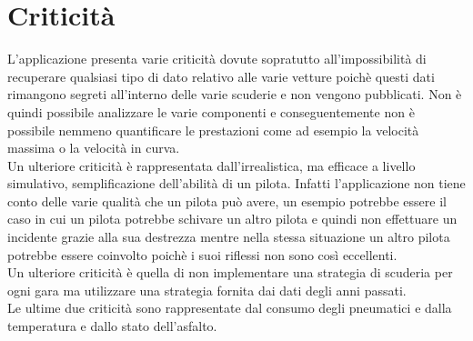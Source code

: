 \section[Criticità]{Criticità} %
L'applicazione presenta varie criticità dovute sopratutto all'impossibilità di recuperare qualsiasi tipo di dato relativo alle varie vetture poichè questi dati rimangono segreti all'interno delle varie scuderie e non vengono pubblicati. Non è quindi possibile analizzare le varie componenti e conseguentemente non è possibile nemmeno quantificare le prestazioni come ad esempio la velocità massima o la velocità in curva.\\
Un ulteriore criticità è rappresentata dall'irrealistica, ma efficace a livello simulativo, semplificazione dell'abilità di un pilota. Infatti l'applicazione non tiene conto delle varie qualità che un pilota può avere, un esempio potrebbe essere il caso in cui un pilota potrebbe schivare un altro pilota e quindi non effettuare un incidente grazie alla sua destrezza mentre nella stessa situazione un altro pilota potrebbe essere coinvolto poichè i suoi riflessi non sono così eccellenti.\\
Un ulteriore criticità è quella di non implementare una strategia di scuderia per ogni gara ma utilizzare una strategia fornita dai dati degli anni passati.\\
Le ultime due criticità sono rappresentate dal consumo degli pneumatici e dalla temperatura e dallo stato dell'asfalto.

